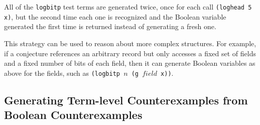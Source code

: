 \documentclass[submission,copyright,creativecommons]{eptcs}
\newcommand*{\var}[1]{\mathit{#1}}
\begin{document}
All of the \texttt{logbitp} test terms are generated twice, once for each call
\texttt{(loghead 5 x)}, but the second time each one is recognized and
the Boolean variable generated the first time is returned instead of
generating a fresh one.

This strategy can be used to reason about more complex structures.
For example, if a conjecture references an arbitrary record but only
accesses a fixed set of fields and a fixed number of bits of each
field, then it can generate Boolean variables as above for the fields,
such as \texttt{(logbitp $n$ (g $\var{field}$ x))}.

\subsection{Generating Term-level Counterexamples from Boolean Counterexamples}
\label{sec:counterexes}
\end{document}
